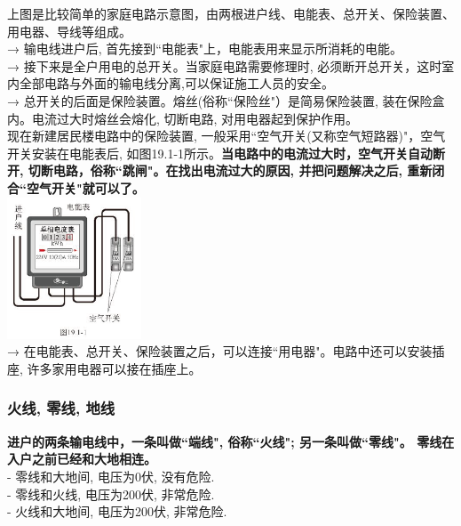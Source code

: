 \documentclass[UTF8]{ctexart}
\begin{document}
上图是比较简单的家庭电路示意图，由两根进户线、电能表、总开关、保险装置、用电器、导线等组成。 \\
→ 输电线进户后, 首先接到``电能表"上，电能表用来显示所消耗的电能。 \\
→ 接下来是全户用电的总开关。当家庭电路需要修理时, 必须断开总开关，这时室内全部电路与外面的输电线分离,可以保证施工人员的安全。 \\
→ 总开关的后面是保险装置。熔丝(俗称``保险丝"）是简易保险装置, 装在保险盒内。电流过大时熔丝会熔化, 切断电路, 对用电器起到保护作用。 \\
现在新建居民楼电路中的保险装置, 一般采用``空气开关(又称空气短路器)"，空气开关安装在电能表后, 如图19.1-1所示。\textbf{当电路中的电流过大时，空气开关自动断开, 切断电路，俗称``跳闸"。在找出电流过大的原因, 并把问题解决之后, 重新闭合``空气开关"就可以了。} \\

\includegraphics[width=0.3\textwidth]{img/0062.png} \\

→ 在电能表、总开关、保险装置之后，可以连接``用电器"。电路中还可以安装插座, 许多家用电器可以接在插座上。\\

\vspace{1em} 

\subsubsection{火线, 零线, 地线}

\textbf{进户的两条输电线中，一条叫做``端线", 俗称``火线"; 另一条叫做``零线"。 零线在入户之前已经和大地相连。} \\
- 零线和大地间, 电压为0伏, 没有危险. \\
- 零线和火线, 电压为200伏, 非常危险. \\
- 火线和大地间, 电压为200伏, 非常危险. \\
\end{document}
